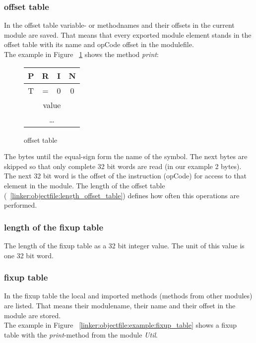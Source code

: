 \subsubsection{offset table}
\label{linker:objectfile:offset_table}
In the offset table variable- or methodnames and their offsets in the current
module are saved. That means that every exported module element stands in the
offset table with its name and opCode offset in the modulefile.  \\
The example in Figure ~\ref{linker:objectfile:example:offset_table} shows the
method \emph{print}:

\begin{figure}[h]
	\begin{center}
		\begin{tabular}{|c|c|c|c|}
			\hline
			P &  R & I & N \\
			\hline
			T &  = &  0 & 0 \\
			\hline 
			\multicolumn{4}{|c|}{value} \\
			\hline
			\multicolumn{4}{|c|}{\ldots} \\
			\hline
		\end{tabular}
	\end{center}
	\caption{offset table}
	\label{linker:objectfile:example:offset_table}
\end{figure}

The bytes until the equal-sign form the name of the symbol. The next bytes
are skipped so that only complete 32 bit words are read (in our example 2 bytes). 
The next 32 bit word is the offset of the instruction (opCode) for access to that 
element in the module. The length of the offset table (~\ref{linker:objectfile:length_offset_table})  
defines how often this operations are performed. 

\subsubsection{length of the fixup table}
\label{linker:objectfile:length_fixup_table}
The length of the fixup table as a 32 bit integer value. The unit of this value
is one 32 bit word. 
\subsubsection{fixup table}
\label{linker:objectfile:fixup_table}
In the fixup table the local and imported methods (methods from other modules) are
listed. That means their modulename, their name and their offset in the module are stored. \\
The example in Figure ~\ref{linker:objectfile:example:fixup_table} shows a fixup
table with the \emph{print}-method from the module \emph{Util}.

